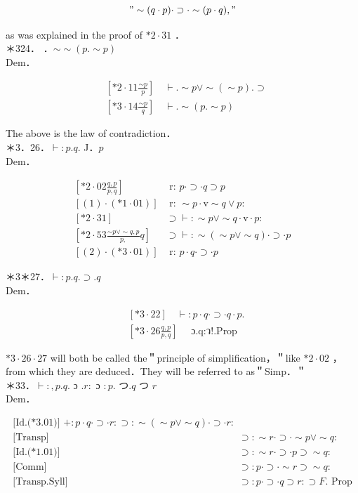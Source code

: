 \documentclass[10pt]{article}
\begin{document}
$$
" \sim(q \cdot p) \cdot \supset \cdot \sim(p \cdot q), "
$$

as was explained in the proof of $* 2 \cdot 31$ ．\\
＊324． ．$\sim \sim(p . \sim p)$\\
Dem．

$$
\begin{aligned}
& {\left[* 2 \cdot 11 \frac{\sim p}{p}\right] \quad \vdash . \sim p \vee \sim(\sim p) . \supset} \\
& {\left[* 3 \cdot 14 \frac{\sim p}{q}\right] \quad \vdash . \sim(p . \sim p)}
\end{aligned}
$$

The above is the law of contradiction．\\
＊3．26．$\vdash: p . q$. J．$p$\\
Dem．

$$
\begin{array}{ll}
{\left[* 2 \cdot 02 \frac{q, p}{p, q}\right]} & \text { r: } p \cdot \supset \cdot q \supset p \\
{[(1) \cdot(* 1 \cdot 01)]} & \text { r: } \sim p \cdot \mathrm{v} \sim q \vee p: \\
{[* 2 \cdot 31]} & \supset \vdash: \sim p \vee \sim q \cdot \mathrm{v} \cdot p: \\
{\left[* 2 \cdot 53 \frac{\sim p \vee \sim q, p}{p,} q\right]} & \supset \vdash: \sim(\sim p \vee \sim q) \cdot \supset \cdot p \\
{[(2) \cdot(* 3 \cdot 01)]} & \text { r: } p \cdot q \cdot \supset \cdot p
\end{array}
$$

＊3＊27．$\vdash: p . q . \supset . q$\\
Dem．

$$
\begin{aligned}
& {[* 3 \cdot 22] \quad \vdash: p \cdot q \cdot \supset \cdot q \cdot p .} \\
& {\left[* 3 \cdot 26 \frac{q, p}{p, q}\right] \quad \text { ɔ.q:ว!.Prop }}
\end{aligned}
$$

$* 3 \cdot 26 \cdot 27$ will both be called the＂principle of simplification，＂like $* 2 \cdot 02$ ， from which they are deduced．They will be referred to as＂Simp．＂\\
＊33．$\vdash:, p . q$. ɔ $. r:$ ɔ $: p$. つ.$q$ つ $r$\\
Dem．

$$
\begin{array}{ll}
\text { [Id.(*3.01)] }+: p \cdot q \cdot \supset \cdot r: \supset: \sim(\sim p \vee \sim q) \cdot \supset \cdot r: \\
\text { [Transp] } & \supset: \sim r \cdot \supset \cdot \sim p \vee \sim q: \\
\text { [Id.(*1.01)] } & \supset: \sim r \cdot \supset \cdot p \supset \sim q: \\
\text { [Comm] } & \supset: p \cdot \supset \cdot \sim r \supset \sim q: \\
\text { [Transp.Syll] } & \supset: p \cdot \supset \cdot q \supset r: \supset F . \text { Prop }
\end{array}
$$
\end{document}
